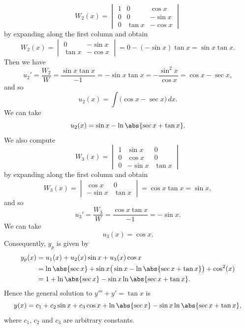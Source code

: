 \begin{solution}
	\[
	W_2(x) = 
	\begin{vmatrix}
		1 & 0 & \cos x \\[6pt]
		0 & 0 & -\sin x\\[6pt]
		0 & \tan x& -\cos x
	\end{vmatrix}
	\]
by expanding along the first column and obtain
	\[
	W_2(x) = 
	\begin{vmatrix}
		0 & -\sin x \\[6pt]
		\tan x & -\cos x
	\end{vmatrix}
	=   0 - (-\sin x) \tan x 
	= \sin x \tan x.
	\]
Then we have
	\[
	u_2' = \frac{W_2}{W} = \frac{ \sin x \tan x }{ -1 } = -\sin x \tan x =-\frac{\sin^2x}{\cos x}= \cos x- \sec x,
	\]
	and so  \[u_2(x) = \int \big(\cos x- \sec x\big)\, dx.\] We can take \[u_2(x)= \sin x- \ln\abs{\sec x+\tan x}.\]
We also compute
	\[
	W_3(x) =
	\begin{vmatrix}
		1 & \sin x & 0 \\[6pt]
		0 & \cos x & 0 \\[6pt]
		0 & -\sin x & \tan x
	\end{vmatrix}
	\]
by expanding along the first column and obtain
	\[
	W_3(x) = 
	\begin{vmatrix}
		\cos x & 0 \\[6pt]
		-\sin x & \tan x
	\end{vmatrix}
= \cos x \tan x = \sin x,
	\]
and so
	\[
	u_3' = \frac{W_3}{W} = \frac{ \cos x \tan x }{ -1 } = - \sin x.
	\]
	We can take \[u_3(x) = \cos x.\]
Consequently, $y_p$ is given by
	\[
	\begin{aligned}
			y_p(x) &= u_1(x)  + u_2(x) \sin x + u_3(x) \cos x\\
			&= \ln\abs{\sec x}+ \sin x\big(\sin x-\ln\abs{\sec x+\tan x}\big)+\cos^2(x)\\
			&=1+\ln\abs{\sec x}-\sin x\ln\abs{\sec x+\tan x}.
	\end{aligned}
	\]
Hence the general solution to $y'''+y' = \tan x$ is
	\[
		y(x) = c_1 + c_2 \sin x + c_3 \cos x +\ln\abs{\sec x}-\sin x\ln\abs{\sec x+\tan x},\]
		where $c_1$, $c_2$ and $c_3$ are arbitrary constants.
\end{solution}



